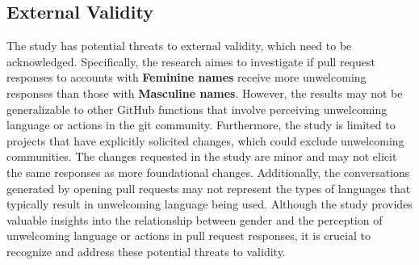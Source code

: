 \documentclass[journal,12pt,onecolumn,]{IEEEtran}
\begin{document}
\subsection{External Validity}
The study has potential threats to external validity, which need to be acknowledged. Specifically, the research aimes to investigate if pull request responses to accounts with \textbf{Feminine names} receive more unwelcoming responses than those with \textbf{Masculine names}. However, the results may not be generalizable to other GitHub functions that involve perceiving unwelcoming language or actions in the git community. Furthermore, the study is limited to projects that have explicitly solicited changes, which could exclude unwelcoming communities. The changes requested in the study are minor and may not elicit the same responses as more foundational changes. Additionally, the conversations generated by opening pull requests may not represent the types of languages that typically result in unwelcoming language being used. Although the study provides valuable insights into the relationship between gender and the perception of unwelcoming language or actions in pull request responses, it is crucial to recognize and address these potential threats to validity.


%



\end{document}
